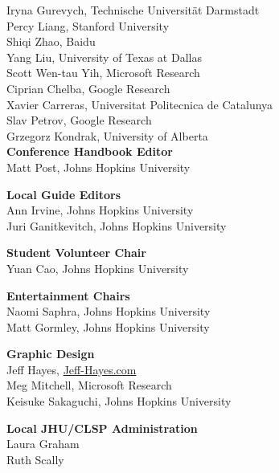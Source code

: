 Iryna Gurevych, Technische Universität Darmstadt  \\
Percy Liang, Stanford University  \\
Shiqi Zhao, Baidu  \\
Yang Liu, University of Texas at Dallas  \\
Scott Wen-tau Yih, Microsoft Research  \\
Ciprian Chelba, Google Research  \\
Xavier Carreras, Universitat Politecnica de Catalunya  \\
Slav Petrov, Google Research  \\
Grzegorz Kondrak, University of Alberta  \\

{\bf Conference Handbook Editor} \\
Matt Post, Johns Hopkins University \\

{\bf Local Guide Editors} \\
Ann Irvine, Johns Hopkins University \\
Juri Ganitkevitch, Johns Hopkins University \\

{\bf Student Volunteer Chair} \\
Yuan Cao, Johns Hopkins University \\

{\bf Entertainment Chairs} \\
Naomi Saphra, Johns Hopkins University\\
Matt Gormley, Johns Hopkins University\\

{\bf Graphic Design} \\
Jeff Hayes, \url{Jeff-Hayes.com}\\
Meg Mitchell, Microsoft Research\\
Keisuke Sakaguchi, Johns Hopkins University\\

{\bf Local JHU/CLSP Administration} \\
Laura Graham\\
Ruth Scally\\
